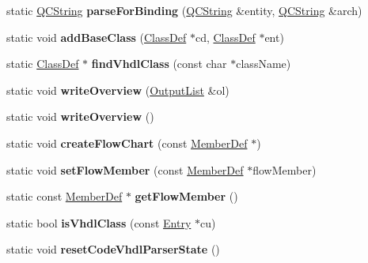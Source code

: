 \begin{DoxyCompactItemize}
static \mbox{\hyperlink{class_q_c_string}{Q\+C\+String}} {\bfseries parse\+For\+Binding} (\mbox{\hyperlink{class_q_c_string}{Q\+C\+String}} \&entity, \mbox{\hyperlink{class_q_c_string}{Q\+C\+String}} \&arch)
\item 
\mbox{\label{class_vhdl_doc_gen_a4892ca19efc7055ce4b5c3004ce550ed}} 
static void {\bfseries add\+Base\+Class} (\mbox{\hyperlink{class_class_def}{Class\+Def}} $\ast$cd, \mbox{\hyperlink{class_class_def}{Class\+Def}} $\ast$ent)
\item 
\mbox{\label{class_vhdl_doc_gen_a03533511b8edfac47bb8e53b9cfb1d3d}} 
static \mbox{\hyperlink{class_class_def}{Class\+Def}} $\ast$ {\bfseries find\+Vhdl\+Class} (const char $\ast$class\+Name)
\item 
\mbox{\label{class_vhdl_doc_gen_a4c14772902ff4d4bf2a55291debd628e}} 
static void {\bfseries write\+Overview} (\mbox{\hyperlink{class_output_list}{Output\+List}} \&ol)
\item 
\mbox{\label{class_vhdl_doc_gen_a658c57fb74c0fde61d0002a979710416}} 
static void {\bfseries write\+Overview} ()
\item 
\mbox{\label{class_vhdl_doc_gen_a2de08afddfa24b4a037c36ac329185ff}} 
static void {\bfseries create\+Flow\+Chart} (const \mbox{\hyperlink{class_member_def}{Member\+Def}} $\ast$)
\item 
\mbox{\label{class_vhdl_doc_gen_a7808cdf56c299daceed3212b65b8a031}} 
static void {\bfseries set\+Flow\+Member} (const \mbox{\hyperlink{class_member_def}{Member\+Def}} $\ast$flow\+Member)
\item 
\mbox{\label{class_vhdl_doc_gen_a12b2126cfa1cf80aeab17ae40d673d67}} 
static const \mbox{\hyperlink{class_member_def}{Member\+Def}} $\ast$ {\bfseries get\+Flow\+Member} ()
\item 
\mbox{\label{class_vhdl_doc_gen_a7b7df19eb23b1532bc1d05c7ffe6cd76}} 
static bool {\bfseries is\+Vhdl\+Class} (const \mbox{\hyperlink{class_entry}{Entry}} $\ast$cu)
\item 
\mbox{\label{class_vhdl_doc_gen_a60e16e249eaf1829c224b054ff743ce7}} 
static void {\bfseries reset\+Code\+Vhdl\+Parser\+State} ()
\end{DoxyCompactItemize}


